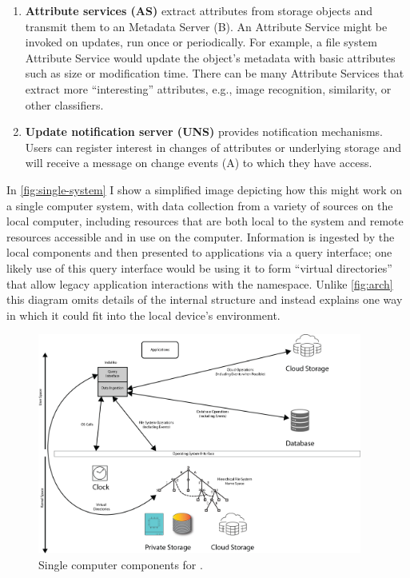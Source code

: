 \begin{enumerate}
    \item \textbf{Attribute services (AS)} extract attributes from storage objects and transmit them to an Metadata Server (B). An Attribute Service
          might be invoked on updates, run once or periodically. For example, a file
          system Attribute Service would update the object's metadata with basic attributes such as size
          or modification time. There can be many Attribute Services that extract more ``interesting''
          attributes, e.g., image recognition, similarity, or other classifiers.

    \item \textbf{Update notification server (UNS)} provides notification mechanisms. Users can register interest in changes of
          attributes or underlying storage and will receive a message on change events (A)
          to which they have access.

\end{enumerate}

In \autoref{fig:single-system} I show a simplified image depicting how this
might work on a single computer system, with data collection from a variety of sources on
the local computer, including resources that are both local to the system and
remote resources accessible and in use on the computer.  Information is
ingested by the local \system components and then presented to applications via
a query interface; one likely use of this query interface would be using it to
form ``virtual directories'' that allow legacy application interactions with the
namespace. Unlike \autoref{fig:arch} this diagram omits details of the internal
structure and instead explains one way in which it could fit into the local
device's environment.

\begin{figure}
    \centering
    \includegraphics[width=0.95\textwidth]{figures/indaleko-arch.png}
    \caption{Single computer components for \system.}
    \label{fig:single-system}
\end{figure}


